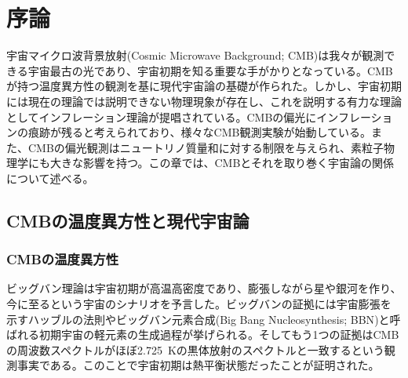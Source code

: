 \chapter{序論}
\label{chapter1}
宇宙マイクロ波背景放射(Cosmic Microwave Background; CMB)は我々が観測できる宇宙最古の光であり、宇宙初期を知る重要な手がかりとなっている。CMBが持つ温度異方性の観測を基に現代宇宙論の基礎が作られた。しかし、宇宙初期には現在の理論では説明できない物理現象が存在し、これを説明する有力な理論としてインフレーション理論が提唱されている。CMBの偏光にインフレーションの痕跡が残ると考えられており、様々なCMB観測実験が始動している。また、CMBの偏光観測はニュートリノ質量和に対する制限を与えられ、素粒子物理学にも大きな影響を持つ。この章では、CMBとそれを取り巻く宇宙論の関係について述べる。

\section{CMBの温度異方性と現代宇宙論}


\subsection{CMBの温度異方性}
ビッグバン理論は宇宙初期が高温高密度であり、膨張しながら星や銀河を作り、今に至るという宇宙のシナリオを予言した。ビッグバンの証拠には宇宙膨張を示すハッブルの法則やビッグバン元素合成(Big Bang Nucleosynthesis; BBN\cite{BBN})と呼ばれる初期宇宙の軽元素の生成過程が挙げられる。そしてもう1つの証拠はCMBの周波数スペクトルがほぼ\SI{2.725}{K}の黒体放射のスペクトルと一致するという観測事実\cite{2725}である。このことで宇宙初期は熱平衡状態だったことが証明された。

